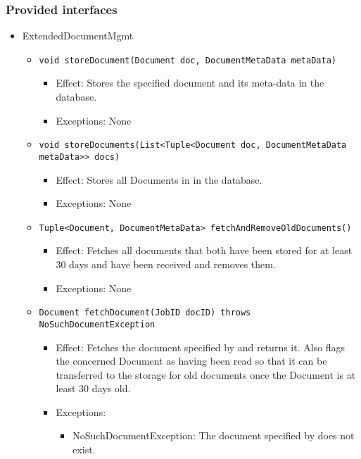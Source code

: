 \subsubsection*{Provided interfaces}
\begin{itemize}
    \item ExtendedDocumentMgmt
	\begin{itemize}
		\item \texttt{void storeDocument(Document doc, DocumentMetaData metaData)}
		\begin{itemize}
			\item Effect: Stores the specified document and its meta-data in the database.
			\item Exceptions: None
		\end{itemize}

		\item \texttt{void storeDocuments(List<Tuple<Document doc, DocumentMetaData metaData>> docs)}
		\begin{itemize}
			\item Effect: Stores all Documents in  in the database.
			\item Exceptions: None
		\end{itemize}

		\item \texttt{Tuple<Document, DocumentMetaData> fetchAndRemoveOldDocuments()}
		\begin{itemize}
			\item Effect: Fetches all documents that both have been stored for at least 30 days and have been received and removes them.
			\item Exceptions: None
		\end{itemize}

		\item \texttt{Document fetchDocument(JobID docID) throws NoSuchDocumentException}
		\begin{itemize}
			\item Effect: Fetches the document specified by  and returns it. Also flags the concerned Document as having been read so that it can be transferred to the storage for old documents once the Document is at least 30 days old.
			\item Exceptions:
			\begin{itemize}
				\item NoSuchDocumentException: The document specified by  does not exist.
			\end{itemize}
		\end{itemize}
				

\end{itemize}
\end{itemize}

